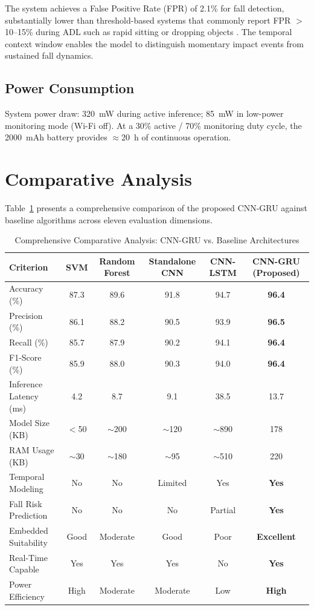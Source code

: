 \documentclass[conference]{IEEEtran}
\begin{document}
The system achieves a False Positive Rate (FPR) of 2.1\% for fall detection, substantially lower than threshold-based systems that commonly report FPR $>$10--15\% during ADL such as rapid sitting or dropping objects \cite{b4}. The temporal context window enables the model to distinguish momentary impact events from sustained fall dynamics.

\subsection{Power Consumption}

System power draw: 320~mW during active inference; 85~mW in low-power monitoring mode (Wi-Fi off). At a 30\% active / 70\% monitoring duty cycle, the 2000~mAh battery provides $\approx$20~h of continuous operation.

\section{Comparative Analysis}

Table~\ref{tab:comparison} presents a comprehensive comparison of the proposed CNN-GRU against baseline algorithms across eleven evaluation dimensions.

\begin{table}[!t]
\caption{Comprehensive Comparative Analysis: CNN-GRU vs. Baseline Architectures}
\label{tab:comparison}
\centering
\begin{tabular}{|l|c|c|c|c|c|}
\hline
\textbf{Criterion} & \textbf{SVM \cite{b4}} & \textbf{Random Forest \cite{b34}} & \textbf{Standalone CNN \cite{b33}} & \textbf{CNN-LSTM \cite{b5}} & \textbf{CNN-GRU (Proposed)} \\
\hline
Accuracy (\%) & 87.3 & 89.6 & 91.8 & 94.7 & \textbf{96.4} \\
\hline
Precision (\%) & 86.1 & 88.2 & 90.5 & 93.9 & \textbf{96.5} \\
\hline
Recall (\%) & 85.7 & 87.9 & 90.2 & 94.1 & \textbf{96.4} \\
\hline
F1-Score (\%) & 85.9 & 88.0 & 90.3 & 94.0 & \textbf{96.4} \\
\hline
Inference Latency (ms) & 4.2 & 8.7 & 9.1 & 38.5 & 13.7 \\
\hline
Model Size (KB) & $<$50 & $\sim$200 & $\sim$120 & $\sim$890 & 178 \\
\hline
RAM Usage (KB) & $\sim$30 & $\sim$180 & $\sim$95 & $\sim$510 & 220 \\
\hline
Temporal Modeling & No & No & Limited & Yes & \textbf{Yes} \\
\hline
Fall Risk Prediction & No & No & No & Partial & \textbf{Yes} \\
\hline
Embedded Suitability & Good & Moderate & Good & Poor & \textbf{Excellent} \\
\hline
Real-Time Capable & Yes & Yes & Yes & No & \textbf{Yes} \\
\hline
Power Efficiency & High & Moderate & Moderate & Low & \textbf{High} \\
\hline
\end{tabular}
\end{table}
\end{document}
